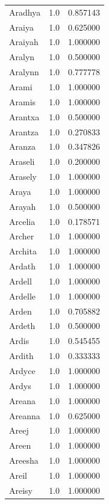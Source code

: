 \documentclass[
  letterpaper,
  DIV=11,
  numbers=noendperiod]{scrreprt}
\begin{document}
\begin{tabular}{lrr}
Aradhya         &   1.0 &   0.857143 \\
Araiya          &   1.0 &   0.625000 \\
Araiyah         &   1.0 &   1.000000 \\
Aralyn          &   1.0 &   0.500000 \\
Aralynn         &   1.0 &   0.777778 \\
Arami           &   1.0 &   1.000000 \\
Aramis          &   1.0 &   1.000000 \\
Arantxa         &   1.0 &   0.500000 \\
Arantza         &   1.0 &   0.270833 \\
Aranza          &   1.0 &   0.347826 \\
Araseli         &   1.0 &   0.200000 \\
Arasely         &   1.0 &   1.000000 \\
Araya           &   1.0 &   1.000000 \\
Arayah          &   1.0 &   0.500000 \\
Arcelia         &   1.0 &   0.178571 \\
Archer          &   1.0 &   1.000000 \\
Archita         &   1.0 &   1.000000 \\
Ardath          &   1.0 &   1.000000 \\
Ardell          &   1.0 &   1.000000 \\
Ardelle         &   1.0 &   1.000000 \\
Arden           &   1.0 &   0.705882 \\
Ardeth          &   1.0 &   0.500000 \\
Ardis           &   1.0 &   0.545455 \\
Ardith          &   1.0 &   0.333333 \\
Ardyce          &   1.0 &   1.000000 \\
Ardys           &   1.0 &   1.000000 \\
Areana          &   1.0 &   1.000000 \\
Areanna         &   1.0 &   0.625000 \\
Areej           &   1.0 &   1.000000 \\
Areen           &   1.0 &   1.000000 \\
Areesha         &   1.0 &   1.000000 \\
Areil           &   1.0 &   1.000000 \\
Areisy          &   1.0 &   1.000000 \\

\end{tabular}
\end{document}
